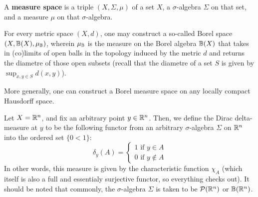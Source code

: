         \begin{definition}
            A \textbf{measure space} is a triple $(X, \Sigma, \mu)$ of a set $X$, a $\sigma$-algebra $\Sigma$ on that set, and a measure $\mu$ on that $\sigma$-algebra.
        \end{definition}
        \begin{example}
            For every metric space $(X,d)$, one may construct a so-called Borel space $(X, \mathbb{B}(X), \mu_{\mathbb{B}})$, wherein $\mu_{\mathbb{B}}$ is the measure on the Borel algebra $\mathbb{B}(X)$ that takes in (co)limits of open balls in the topology induced by the metric $d$ and returns the diametre of those open subsets (recall that the diametre of a set $S$ is given by $\sup_{x,y \in S} d(x,y)$).

            More generally, one can construct a Borel measure space on any locally compact Hausdorff space.
        \end{example}
        \begin{example}
            Let $X = \mathbb{R}^n$, and fix an arbitrary point $y \in \mathbb{R}^n$. Then, we define the Dirac delta-measure at $y$ to be the following functor from an arbitrary $\sigma$-algebra $\Sigma$ on $\mathbb{R}^n$ into the ordered set $\{0 < 1\}$:
                $$\delta_y(A) = 
                    \begin{cases}
                        \text{$1$ if $y \in A$}
                        \\
                        \text{$0$ if $y \not \in A$}
                    \end{cases}
                $$
            In other words, this measure is given by the characteristic function $\chi_A$ (which itself is also a full and essentialy surjective functor, so everything checks out). It should be noted that commonly, the $\sigma$-algebra $\Sigma$ is taken to be $\mathcal{P}(\mathbb{R}^n)$ or $\mathbb{B}(\mathbb{R}^n)$.
        \end{example}
